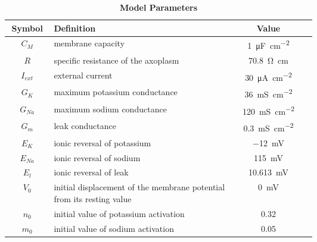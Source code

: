 \documentclass[11pt]{article}
\begin{document}
\begin{table}[H]
\centering
\caption{\label{table:AP} \textbf{Model Parameters}}
\begin{tabular}{ |c|p{0.6\linewidth}|c|c| } 
 \hline
 Symbol & Definition & Value \\ \hline \hline
 $C_M$ & membrane capacity & \SI{1}{\micro\farad\per\centi\meter\squared}  \\ \hline
  $R$ & specific resistance of the axoplasm  & \SI{70.8}{\ohm\centi\meter}  \\ \hline
$I_{ext}$ & external current  & \SI{30}{\micro\ampere\per\centi\meter\squared}  \\ \hline
$G_{K}$ & maximum potassium conductance  & \SI{36}{\milli\siemens\per\centi\meter\squared}  \\ \hline
$G_{Na}$ & maximum sodium conductance  & \SI{120}{\milli\siemens\per\centi\meter\squared}  \\ \hline
$G_{m}$ & leak conductance  & \SI{0.3}{\milli\siemens\per\centi\meter\squared}  \\ \hline
$E_{K}$ & ionic reversal of potassium  & \SI{-12}{\milli\volt}  \\ \hline
$E_{Na}$ & ionic reversal of sodium  & \SI{115}{\milli\volt}  \\ \hline
$E_{l}$ & ionic reversal of leak  & \SI{10.613}{\milli\volt}  \\ \hline
$V_{0}$ & initial displacement of the membrane potential from its resting value  & \SI{0}{\milli\volt}  \\ \hline
$n_{0}$ & initial value of potassium activation  & 0.32  \\ \hline
$m_{0}$ & initial value of sodium activation  & 0.05  \\ \hline
 
\end{tabular}
\end{table}

\printbibliography
\end{document}
